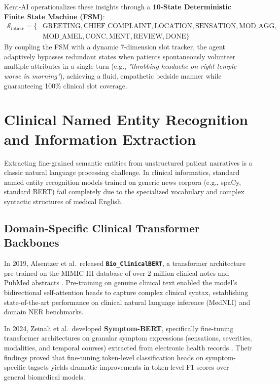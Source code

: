 \begin{sloppypar}
Kent-AI operationalizes these insights through a \textbf{10-State Deterministic Finite State Machine (FSM)}:
\begin{equation}
\begin{aligned}
    \mathcal{S}_{\text{intake}} = \{&\text{GREETING}, \text{CHIEF\_COMPLAINT}, \text{LOCATION}, \text{SENSATION}, \text{MOD\_AGG},\\
    &\text{MOD\_AMEL}, \text{CONC}, \text{MENT}, \text{REVIEW}, \text{DONE}\}
\end{aligned}
\end{equation}
By coupling the FSM with a dynamic 7-dimension slot tracker, the agent adaptively bypasses redundant states when patients spontaneously volunteer multiple attributes in a single turn (e.g., \emph{"throbbing headache on right temple worse in morning"}), achieving a fluid, empathetic bedside manner while guaranteeing 100\% clinical slot coverage.

\section{Clinical Named Entity Recognition and Information Extraction}
Extracting fine-grained semantic entities from unstructured patient narratives is a classic natural language processing challenge. In clinical informatics, standard named entity recognition models trained on generic news corpora (e.g., spaCy, standard BERT) fail completely due to the specialized vocabulary and complex syntactic structures of medical English.

\subsection{Domain-Specific Clinical Transformer Backbones}
In 2019, Alsentzer et al.~released \textbf{\texttt{Bio\_ClinicalBERT}}, a transformer architecture pre-trained on the MIMIC-III database of over 2 million clinical notes and PubMed abstracts \cite{Alsentzer2019}. Pre-training on genuine clinical text enabled the model's bidirectional self-attention heads to capture complex clinical syntax, establishing state-of-the-art performance on clinical natural language inference (MedNLI) and domain NER benchmarks.

In 2024, Zeinali et al.~developed \textbf{Symptom-BERT}, specifically fine-tuning transformer architectures on granular symptom expressions (sensations, severities, modalities, and temporal courses) extracted from electronic health records \cite{Zeinali2024_SymptomBERT}. Their findings proved that fine-tuning token-level classification heads on symptom-specific tagsets yields dramatic improvements in token-level F1 scores over general biomedical models.


\end{sloppypar}
